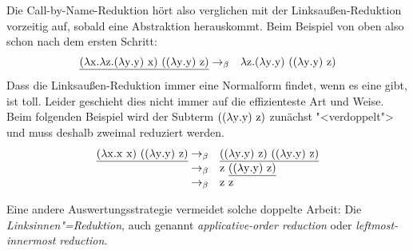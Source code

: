 %
Die Call-by-Name-Reduktion hört also verglichen mit der
Linksaußen-Reduktion vorzeitig auf, sobald eine Abstraktion
herauskommt.  Beim Beispiel von oben also schon nach dem ersten
Schritt:
%
\begin{eqnarray*}
  \underline{(\lambda \mathrm x.\lambda \mathrm z.(\lambda \mathrm y.\mathrm y)~\mathrm x)~((\lambda \mathrm y.\mathrm y)~\mathrm z)}
  &  \rightarrow_\beta &
                         \lambda \mathrm z.(\lambda \mathrm y.\mathrm y)~((\lambda \mathrm y.\mathrm y)~\mathrm z)
\end{eqnarray*}
%
Dass die Linksaußen-Reduktion immer eine Normalform findet, wenn es
eine gibt, ist toll.  Leider geschieht dies nicht immer auf die
effizienteste Art und Weise.
Beim folgenden Beispiel wird der Subterm $((\lambda \mathrm y.\mathrm y)~\mathrm z)$
zunächst "<verdoppelt"> und muss deshalb zweimal reduziert
werden.
%
\begin{displaymath}
  \begin{array}{rl}
  \underline{(\lambda \mathrm x.\mathrm x~\mathrm x)~((\lambda \mathrm y.\mathrm y)~\mathrm z)}
  \rightarrow_{\beta} & 
  \underline{((\lambda \mathrm y.\mathrm y)~\mathrm z)~((\lambda \mathrm y.\mathrm y)~\mathrm z)}
  \\
  \rightarrow_{\beta} & 
  \mathrm z~\underline{((\lambda \mathrm y.\mathrm y)~\mathrm z)}
  \\
  \rightarrow_{\beta} & 
  \mathrm z~\mathrm z
\end{array}
\end{displaymath}
%

Eine andere Auswertungsstrategie 
vermeidet solche doppelte Arbeit:  Die \textit{Linksinnen"=Reduktion},
auch genannt \emph{applicative-order reduction} oder
\emph{leftmost-innermost reduction}.

